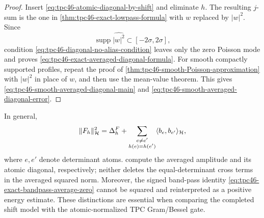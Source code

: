 \begin{proof}
Insert \eqref{eq:tpc46-atomic-diagonal-by-shift} and eliminate \(h\).
The resulting \(j\)-sum is the one in
\cref{thm:tpc46-exact-lowpass-formula} with \(w\) replaced by
\(|w|^2\).  Since
\[
 \operatorname{supp}\widehat{|w|^2}
 \subset[-2\sigma,2\sigma],
\]
condition \eqref{eq:tpc46-diagonal-no-alias-condition} leaves only the
zero Poisson mode and proves
\eqref{eq:tpc46-exact-averaged-diagonal-formula}.  For smooth compactly
supported profiles, repeat the proof of
\cref{thm:tpc46-smooth-Poisson-approximation} with \(|w|^2\) in place
of \(w\), and then use the mean-value theorem.  This gives
\eqref{eq:tpc46-smooth-averaged-diagonal-main} and
\eqref{eq:tpc46-smooth-averaged-diagonal-error}.
\end{proof}

\begin{remark}
\label{rem:tpc46-diagonal-not-full-energy}
In general,
\[
 \|F_h\|_{\mathcal H}^2
 =\Delta_h^F+
 \sum_{\substack{e\ne e'\\h(e)=h(e')}}
 \langle b_e,b_{e'}\rangle_{\mathcal H},
\]
where \(e,e'\) denote determinant atoms.
compute the averaged
amplitude and its atomic diagonal, respectively; neither deletes the
equal-determinant cross terms in the averaged squared norm.  Moreover,
the signed band-pass identity
\eqref{eq:tpc46-exact-bandpass-average-zero} cannot be squared and
reinterpreted as a positive energy estimate.  These distinctions are
essential when comparing the completed shift model with the
atomic-normalized TPC Gram/Bessel gate.
\end{remark}
